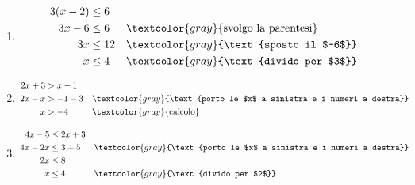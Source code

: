 \begin{question}[ID=1.2, subtitle={Disequazioni di primo grado}, difficulty=facile, tags={disequazioni lineari}]
\begin{explanation}
\begin{enumerate}
\[\begin{aligned}
    2x &> 4 && \textcolor{gray}{\text{sposto il $2$}}\\
    x &> 2 && \textcolor{gray}{\text{divido per $2$}}
    \end{aligned}\]
    \item \[\begin{aligned}
    3(x-2) &\leq 6\\
    3x-6 &\leq 6 && \textcolor{gray}{\text{svolgo la parentesi}}\\
    3x &\leq 12 && \textcolor{gray}{\text{sposto il $-6$}}\\
    x &\leq 4 && \textcolor{gray}{\text{divido per $3$}}
    \end{aligned}\]
    \item \[\begin{aligned}
    2x+3 &> x-1\\
    2x-x &> -1-3 && \textcolor{gray}{\text{porto le $x$ a sinistra e i numeri a destra}}\\
    x &> -4 && \textcolor{gray}{\text{calcolo}}
    \end{aligned}\]
    \item \[\begin{aligned}
    4x-5 &\leq 2x+3\\
    4x-2x &\leq 3+5 && \textcolor{gray}{\text{porto le $x$ a sinistra e i numeri a destra}}\\
    2x &\leq 8\\
    x &\leq 4 && \textcolor{gray}{\text{divido per $2$}}
    \end{aligned}\]
\end{enumerate}
\end{explanation}
\end{question}


